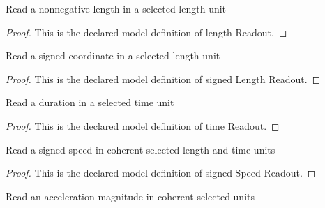\begin{definition}
  \label{def:physics:phyx-mini-0706:phyxminiproblems-problemphyxmini0706-lengthreadout}
  Read a nonnegative length in a selected length unit
\end{definition}
\begin{proof}
  This is the declared model definition of length Readout.
\end{proof}
\begin{definition}
  \label{def:physics:phyx-mini-0706:phyxminiproblems-problemphyxmini0706-signedlengthreadout}
  Read a signed coordinate in a selected length unit
\end{definition}
\begin{proof}
  This is the declared model definition of signed Length Readout.
\end{proof}
\begin{definition}
  \label{def:physics:phyx-mini-0706:phyxminiproblems-problemphyxmini0706-timereadout}
  Read a duration in a selected time unit
\end{definition}
\begin{proof}
  This is the declared model definition of time Readout.
\end{proof}
\begin{definition}
  \label{def:physics:phyx-mini-0706:phyxminiproblems-problemphyxmini0706-signedspeedreadout}
  Read a signed speed in coherent selected length and time units
\end{definition}
\begin{proof}
  This is the declared model definition of signed Speed Readout.
\end{proof}
\begin{definition}
  \label{def:physics:phyx-mini-0706:phyxminiproblems-problemphyxmini0706-accelerationreadout}
  Read an acceleration magnitude in coherent selected units
\end{definition}
